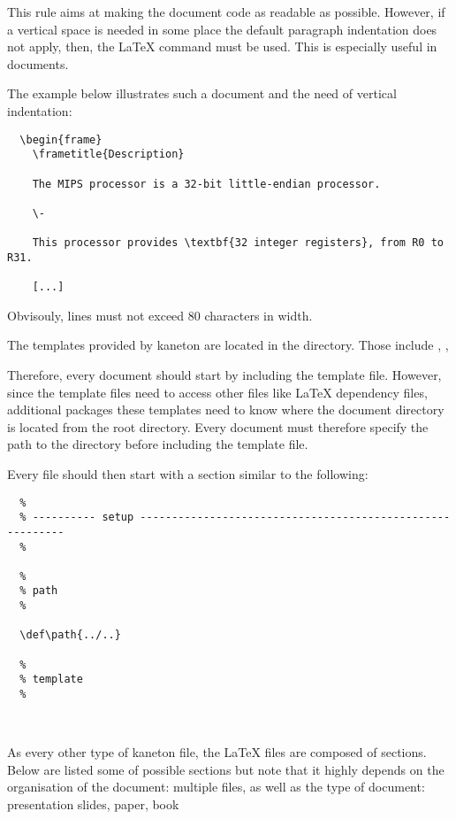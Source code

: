 This rule aims at making the document code as readable as possible. However,
if a vertical space is needed in some place the default paragraph indentation
does not apply, then, the \code{\latex{-}} {\LaTeX} command must be used. This
is especially useful in  documents.

The example below illustrates such a  document and the
need of vertical indentation:

\begin{verbatim}
  \begin{frame}
    \frametitle{Description}

    The MIPS processor is a 32-bit little-endian processor.

    \-

    This processor provides \textbf{32 integer registers}, from R0 to R31.

    [...]
\end{verbatim}

Obvisouly, lines must not exceed $80$ characters in width.

The templates provided by kaneton are located in the 
directory. Those include , ,  \etc{}

Therefore, every document should start by including the template file.
However, since the template files need to access other files like
{\LaTeX} dependency files, additional packages \etc{} these templates need to
know where the document directory is located from the root 
directory. Every document must therefore specify the path to the
 directory before including the template file.

Every file should then start with a  section similar to the
following:

\begin{verbatim}
  %
  % ---------- setup ----------------------------------------------------------
  %

  %
  % path
  %

  \def\path{../..}

  %
  % template
  %

  
\end{verbatim}

As every other type of kaneton file, the {\LaTeX} files are composed of
sections. Below are listed some of possible sections but note that it
highly depends on the organisation of the document: multiple files, \etc{}
as well as the type of document: presentation slides, paper, book \etc{}

